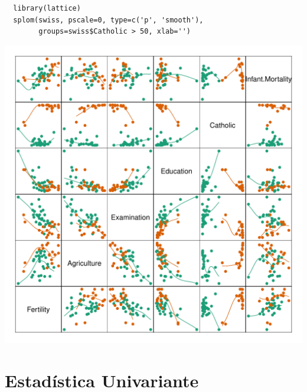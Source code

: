 \documentclass[xcolor={usenames,svgnames,dvipsnames}]{beamer}
\begin{document}
\begin{frame}[fragile,label=sec-1-3]{}
 \lstset{language=R,label= ,caption= ,numbers=none}
\begin{lstlisting}
  library(lattice)
  splom(swiss, pscale=0, type=c('p', 'smooth'),
        groups=swiss$Catholic > 50, xlab='')
\end{lstlisting}

\includegraphics[width=.9\linewidth]{figs/splomSwiss.pdf}
\end{frame}

\section{Estadística Univariante}
\label{sec-2}
\end{document}
